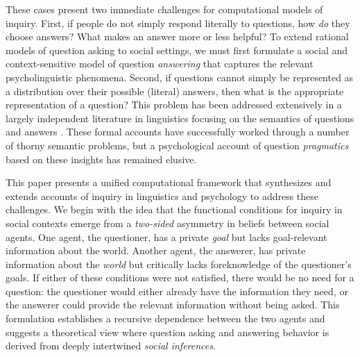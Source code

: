 \documentclass[11pt, floatsintext]{apa6}
\begin{document}

These cases present two immediate challenges for computational models of inquiry. 
First, if people do not simply respond literally to questions, how \emph{do} they choose answers? 
What makes an answer more or less helpful?
To extend rational models of question asking to social settings, we must first formulate a social and context-sensitive model of question \emph{answering} that captures the relevant psycholinguistic phenomena.
Second, if questions cannot simply be represented as a distribution over their possible (literal) answers, then what is the appropriate representation of a question?
This problem has been addressed extensively in a largely independent literature in linguistics focusing on the semantics of questions and answers \cite{GroenendijkStokhof84_SemanticsOfQuestions,Ginzburg95_ResolvingQuestions,VanRooy03_QuestioningDecisionProblems,ciardelli2013inquisitive}. 
These formal accounts have successfully worked through a number of thorny semantic problems, but a psychological account of question \emph{pragmatics} based on these insights has remained elusive.

This paper presents a unified computational framework that synthesizes and extends accounts of inquiry in linguistics and psychology to address these challenges.
We begin with the idea that the functional conditions for inquiry in social contexts emerge from a \emph{two-sided} asymmetry in beliefs between social agents. 
One agent, the questioner, has a private \emph{goal} but lacks goal-relevant information about the world.
Another agent, the answerer, has private information about the \emph{world} but critically lacks foreknowledge of the questioner's goals.
If either of these conditions were not satisfied, there would be no need for a question: the questioner would either already have the information they need, or the answerer could provide the relevant information without being asked.
This formulation establishes a recursive dependence between the two agents and suggests a theoretical view where question asking and answering behavior is derived from deeply intertwined \emph{social inferences}.
\end{document}
